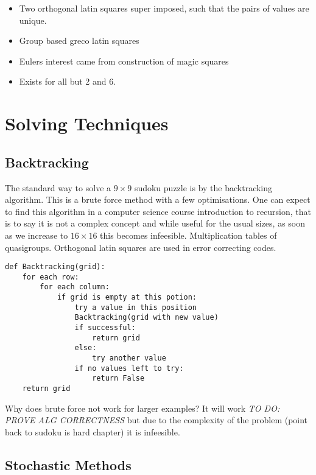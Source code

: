 \documentclass[a4paper,12pt]{article}
\begin{document}
		\begin{itemize}
		\item{Two orthogonal latin squares super imposed, such that the pairs of values are unique.}
		\item{Group based greco latin squares}
		\item{Eulers interest came from construction of magic squares}
		\item{Exists for all but 2 and 6.}
		\end{itemize}

\section{Solving Techniques}
	\subsection{Backtracking}
		
		The standard way to solve a $9 \times 9$ sudoku puzzle is by the backtracking algorithm. 
		This is a brute force method with a few optimisations.
		One can expect to find this algorithm in a computer science course introduction to recursion, that is to say it is not a complex concept 
		and while useful for the usual sizes, as soon as we increase to $16 \times 16$ this becomes infeesible.
		Multiplication tables of quasigroups.
		Orthogonal latin squares are used in error correcting codes.
		
		\begin{lstlisting}[caption=Backtracking]
def Backtracking(grid):
    for each row:
        for each column:
            if grid is empty at this potion:
                try a value in this position
                Backtracking(grid with new value)
                if successful:
                    return grid
                else:
                    try another value
                if no values left to try:
                    return False
    return grid						
		\end{lstlisting}
		
		Why does brute force not work for larger examples? It will work \textit{TO DO: PROVE ALG CORRECTNESS} but due to the complexity of the problem (point back to sudoku is hard chapter) it is infeesible.

	\subsection{Stochastic Methods}
\end{document}
